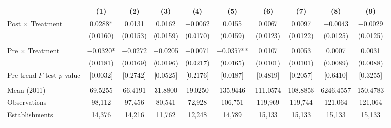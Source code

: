 \documentclass[12pt,letterpaper]{article}
\begin{document}
\begin{table}[]
\begin{threeparttable}
\begin{tabular}{lccccccccc}
 & (1) & (2) & (3) & (4) & (5) & (6) & (7) & (8) & (9) \\
\midrule
Post $\times$ Treatment & 0.0288* & 0.0131 & 0.0162 & $-$0.0062 & 0.0155 & 0.0067 & 0.0097 & $-$0.0043 & $-$0.0029 \\
  & (0.0160) & (0.0153) & (0.0159) & (0.0170) & (0.0159) & (0.0123) & (0.0122) & (0.0125) & (0.0125) \\
  &  &  &  &  &  &  &  &  & \\
Pre $\times$ Treatment & $-$0.0320* & $-$0.0272 & $-$0.0205 & $-$0.0071 & $-$0.0367** & 0.0107 & 0.0053 & 0.0007 & 0.0031 \\
  & (0.0181) & (0.0169) & (0.0196) & (0.0217) & (0.0165) & (0.0101) & (0.0101) & (0.0089) & (0.0088) \\
Pre-trend $F$-test $p$-value & [0.0032] & [0.2742] & [0.0525] & [0.2176] & [0.0187] & [0.4819] & [0.2057] & [0.6410] & [0.3255] \\
  &  &  &  &  &  &  &  &  & \\
Mean (2011) & 69.5255 & 66.4191 & 31.8800 & 19.0250 & 135.9446 & 111.0574 & 108.8858 & 6246.4557 & 150.4783 \\
Observations & 98{,}112 & 97{,}456 & 80{,}541 & 72{,}928 & 106{,}751 & 119{,}969 & 119{,}744 & 121{,}064 & 121{,}064 \\
Establishments & 14{,}376 & 14{,}216 & 11{,}762 & 12{,}248 & 14{,}789 & 15{,}133 & 15{,}133 & 15{,}133 & 15{,}133 \\
  &  &  &  &  &  &  &  &  & \\
\midrule

\end{tabular}
\end{threeparttable}
\end{table}
\end{document}
